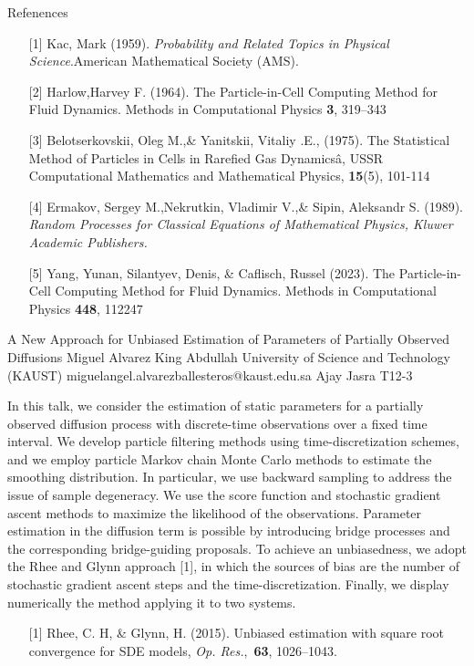 \begin{talk}
Refenences
\begin{enumerate}
	\item[{[1]}] Kac, Mark (1959). {\it Probability and Related Topics in Physical Science}.American Mathematical Society (AMS).
	\item[{[2]}] Harlow,Harvey F.  (1964).   The Particle-in-Cell Computing Method for Fluid Dynamics. Methods in Computational Physics \textbf{3}, 319--343
\item[{[3]}] Belotserkovskii, Oleg M.,\& Yanitskii, Vitaliy .E.,   (1975).  The Statistical Method of Particles in Cells in Rarefied Gas Dynamicsâ, USSR Computational Mathematics and Mathematical Physics,  \textbf{15}(5), 101-114
\item[{[4]}] Ermakov, Sergey M.,Nekrutkin, Vladimir V.,\& Sipin, Aleksandr S.  (1989). {\it Random Processes for Classical Equations of Mathematical Physics, Kluwer Academic Publishers.}
\item[{[5]} ] Yang, Yunan, Silantyev, Denis, \&   Caflisch, Russel (2023).   The Particle-in-Cell Computing Method for Fluid Dynamics. Methods in Computational Physics \textbf{448}, 112247
\end{enumerate}

\end{talk}

\begin{talk}
  {A New Approach for Unbiased Estimation of Parameters of Partially Observed Diffusions}%
  {Miguel Alvarez}%
  {King Abdullah University of Science and Technology (KAUST)}%
  {miguelangel.alvarezballesteros@kaust.edu.sa}%
  {Ajay Jasra}%
  {T12-3}%
			
In this talk, we consider the estimation of static parameters for a partially observed diffusion process with discrete-time observations over a fixed time interval. We develop particle filtering methods using time-discretization schemes, and we employ particle Markov chain Monte Carlo methods to estimate the smoothing distribution. In particular, we use backward sampling to address the issue of sample degeneracy. We use the score function and stochastic gradient ascent methods to maximize the likelihood of the observations. Parameter estimation in the diffusion term is possible by introducing bridge processes and the corresponding bridge-guiding proposals. To achieve an unbiasedness, we adopt the Rhee and Glynn approach [1], in which the sources of bias are the number of stochastic gradient ascent steps and the time-discretization. Finally, we display numerically the method applying it to two systems. 

\medskip

\begin{enumerate}
	\item[{[1]}] Rhee, C. H, \& Glynn, H. (2015).  Unbiased estimation with square root convergence for SDE models, \emph{Op. Res.},~{\bf 63}, 1026--1043. 
\end{enumerate}

\end{talk}

